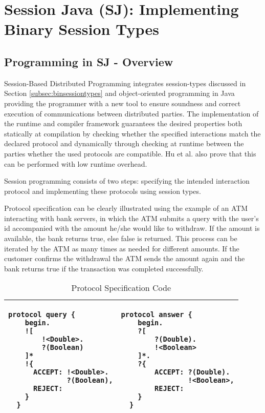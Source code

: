 		
\section{Session Java (SJ): Implementing Binary Session Types}
\label{sec:sessionj}

\subsection{Programming in SJ - Overview}
\label{subsec:sjprogram}
	
Session-Based Distributed Programming integrates session-types discussed in Section \ref{subsec:binsessiontypes} and object-oriented programming in Java providing the programmer with a new tool to ensure soundness and correct execution of communications between distributed parties. The implementation of the runtime and compiler framework guarantees the desired properties both statically at compilation by checking whether the specified interactions match the declared protocol and dynamically through checking at runtime between the parties whether the used protocols are compatible. Hu et al. \cite{sessionbased_programming} also prove that this can be performed with low runtime overhead.

Session programming consists of two steps: specifying the intended interaction protocol and implementing these protocols using session types.

Protocol specification can be clearly illustrated using the example of an ATM interacting with bank servers, in which the ATM submits a query with the user's id accompanied with the amount he/she would like to withdraw. If the amount is available, the bank returns true, else false is returned. This process can be iterated by the ATM as many times as needed for different amounts. If the customer confirms the withdrawal the ATM sends the amount again and the bank returns true if the transaction was completed successfully.

\begin{table}[H]
\center
\caption{Protocol Specification Code}
\begin{tabular}{|l|l|}
\hline

  \begin{lstlisting}[basicstyle=\LISTINGSTYLE]
  protocol query {
    begin.
    ![
        !<Double>.
        ?(Boolean)
    ]*
    !{
      ACCEPT: !<Double>.
              ?(Boolean),
      REJECT:
    }
  }
  \end{lstlisting}
  &
  \begin{lstlisting}[basicstyle=\LISTINGSTYLE]
  protocol answer {
    begin.
    ?[
        ?(Double).
        !<Boolean>
    ]*.
    ?{
        ACCEPT: ?(Double).
                !<Boolean>,
        REJECT:
    }
  }
  \end{lstlisting}\\
  \hline
  
\end{tabular}
\label{CODEprotocol}
\end{table}

